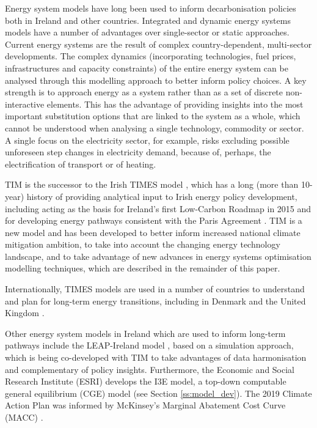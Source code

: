 \documentclass[gmd,manuscript]{copernicus}
\begin{document}
Energy system models have long been used to inform decarbonisation policies both in Ireland and other countries. Integrated and dynamic energy systems models have a number of advantages over single-sector or static approaches. Current energy systems are the result of complex country-dependent, multi-sector developments. The complex dynamics (incorporating technologies, fuel prices, infrastructures and capacity constraints) of the entire energy system can be analysed through this modelling approach to better inform policy choices. A key strength is to approach energy as a system rather than as a set of discrete non-interactive elements. This has the advantage of providing insights into the most important substitution options that are linked to the system as a whole, which cannot be understood when analysing a single technology, commodity or sector. A single focus on the electricity sector, for example, risks excluding possible unforeseen step changes in electricity demand, because of, perhaps, the electrification of transport or of heating. 

TIM is the successor to the Irish TIMES model \citep{EnvironmentalProtectionAgency2020}, which has a long (more than 10-year) history of providing analytical input to Irish energy policy development, including acting as the basis for Ireland’s first Low-Carbon Roadmap in 2015 \citep{Deane2013} and for developing energy pathways consistent with the Paris Agreement \citep{Glynn2019}. TIM is a new model and has been developed to better inform increased national climate mitigation ambition, to take into account the changing energy technology landscape, and to take advantage of new advances in energy systems optimisation modelling techniques, which are described in the remainder of this paper.

Internationally, TIMES models are used in a number of countries to understand and plan for long-term energy transitions, including in Denmark \citep{Balyk2019} and the United Kingdom \citep{fais2016impact,daly2015indirect}. 

Other energy system models in Ireland which are used to inform long-term pathways include the LEAP-Ireland model \citep{MacUidhir2020,rogan2014leaps}, based on a simulation approach, which is being co-developed with TIM to take advantages of data harmonisation and complementary of policy insights. Furthermore, the Economic and Social Research Institute (ESRI) develops the I3E model, a top-down computable general equilibrium (CGE) model (see Section \ref{ss:model_dev}). The 2019 Climate Action Plan was informed by McKinsey's Marginal Abatement Cost Curve (MACC) \citep{DCCAE2019}. 
\end{document}
